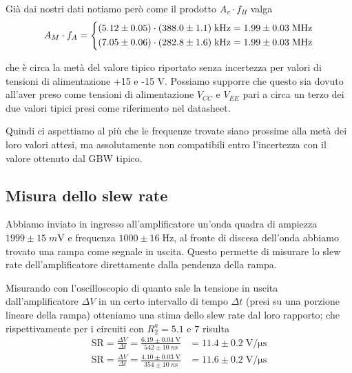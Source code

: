 \documentclass[10pt,a4paper]{article}
\begin{document}
Già dai nostri dati notiamo però come il prodotto $A_v \cdot f_H$ valga
\[
A_M \cdot f_A = 
\begin{dcases}
(5.12 \pm 0.05) \cdot (388.0 \pm 1.1) \; \si{k\Hz} =
1.99 \pm 0.03 \; \si{M\Hz} \\
%
(7.05 \pm 0.06) \cdot (282.8 \pm 1.6) \; \si{k\Hz} =
1.99 \pm 0.03 \; \si{M\Hz} \\
\end{dcases}
\]

che è circa la metà del valore tipico riportato senza incertezza per valori
di tensioni di alimentazione +15 e -15 V. Possiamo supporre che questo sia
dovuto all'aver preso come tensioni di alimentazione $V_{CC}$ e $V_{EE}$
pari a circa un terzo dei due valori tipici presi come riferimento nel
datasheet.

Quindi ci aspettiamo al più che le frequenze trovate siano prossime alla
metà dei loro valori attesi, ma assolutamente non compatibili entro
l'incertezza con il valore ottenuto dal GBW tipico.

\subsection{Misura dello slew rate}
Abbiamo inviato in ingresso all'amplificatore un'onda quadra di ampiezza
$1999 \pm 15 \; \si{m\V}$ e frequenza $1000 \pm 16 \; \si{\Hz}$, al fronte di
discesa dell'onda abbiamo trovato una rampa come segnale in uscita. Questo
permette di misurare lo slew rate dell'amplificatore direttamente dalla
pendenza della rampa.

Misurando con l'oscilloscopio di quanto sale la tensione in uscita
dall'amplificatore $\Delta V$ in un certo intervallo di tempo $\Delta t$
(presi su una porzione lineare della rampa) otteniamo una stima dello slew
rate dal loro rapporto; che rispettivamente per i circuiti con $R_2^a = 5.1$
e $7$ risulta
\begin{align*}
\mathrm{SR} = \frac{\Delta V}{\Delta t} =
\frac{6.19 \pm 0.04 \; \si{\V}}{542 \pm 10 \; \si{n\s}}
&= 11.4 \pm 0.2 \; \si{\V/\micro\s} \\
\mathrm{SR} = \frac{\Delta V}{\Delta t} =
\frac{4.10 \pm 0.03 \; \si{\V}}{354 \pm 10 \; \si{n\s}}
&= 11.6 \pm 0.2 \; \si{\V/\micro\s}  
\end{align*}
\end{document}
